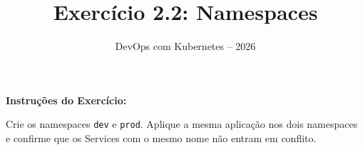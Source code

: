 \documentclass[11pt,a4paper]{article}
\title{\color{secondary}\Huge\textbf{Exercício 2.2: Namespaces}}
\author{\color{primary}DevOps com Kubernetes -- 2026}
\date{}
\begin{document}
\maketitle


\textbf{Instruções do Exercício:}

\begin{tcolorbox}[colback=blue!5!white,colframe=blue!75!black]
Crie os namespaces \texttt{dev} e \texttt{prod}. Aplique a mesma aplicação nos dois namespaces e confirme que os Services com o mesmo nome não entram em conflito.
\end{tcolorbox}
\end{document}
